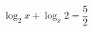\begin{ex}[type=equation]
	\begin{condition}
		 $\log_2 x +\log_x 2 = \dfrac{5}{2}$
	\end{condition}
\end{ex}